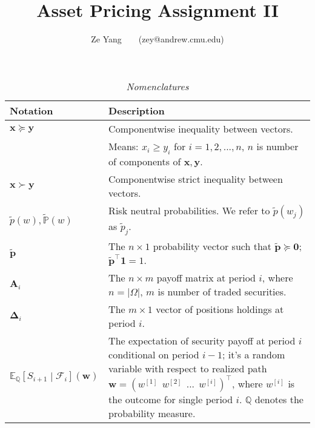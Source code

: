 \documentclass[a4paper, 10pt]{article}
\title{\textbf{Asset Pricing Assignment II}}
\author{Ze Yang~~~~(zey@andrew.cmu.edu)}
\renewcommand{\arraystretch}{1.4}
\theoremstyle{definition}
\theoremstyle{hSol}
\begin{document}
\maketitle

\begin{table}[h]
\vspace{-10pt}
\caption{\textit{Nomenclatures}}
\vspace{3pt}
\centering
\def\arraystretch{1.15}
\begin{tabular}{lL}
\hline
Notation & \hspace{4.6cm} Description \\ 
\hline
$\bm{x}\succeq \bm{y}$ & Componentwise inequality between vectors.\\
& Means: $x_i \geq y_i$ for $i=1,2,...,n$, $n$ is number of components of $\bm{x}, \bm{y}$.\\
$\bm{x}\succ \bm{y}$ & Componentwise strict inequality between vectors.\\
$\tilde{p}(w), \tilde{\mathbb{P}}\left(w\right)$ & Risk neutral probabilities. We refer to $\tilde{p}(w_j)$ as $\tilde{p}_j$.\\
$\tilde{\bm{p}}$ & The $n \times 1$ probability vector such that $\tilde{\bm{p}}\succeq \bm{0}$; $\tilde{\bm{p}}^{\top} \bm{1}=1$.\\
$\bm{A}_i$ & The $n\times m$ payoff matrix at period $i$, where $n=|\Omega|$, $m$ is number of traded securities.\\
$\bm{\Delta}_i$ & The $m\times 1$ vector of positions holdings at period $i$.\\
$\mathbb{E}_{\mathbb{Q}}\left[S_{i+1}\middle|\mathcal{F}_{i}\right](\bm{w})$ & The expectation of security payoff at period $i$ conditional on period $i-1$; it's a random variable with respect to realized path $\bm{w} = (w^{[1]}~~w^{[2]}~~...~~w^{[i]})^{\top}$, where $w^{[i]}$ is the outcome for single period $i$. $\mathbb{Q}$ denotes the probability measure.\\
\hline 
\end{tabular}
\label{tab:Nomen}
\end{table}
\end{document}
